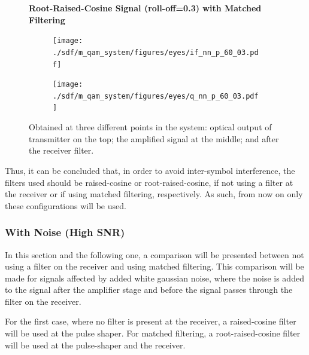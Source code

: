 \begin{refsection}
\begin{table}[H]
\begin{tabular}{|l|l|}
	\end{tabular}
\end{table}
\begin{figure}[H]
		\centering
	\textbf{Root-Raised-Cosine Signal (roll-off=0.3) with Matched Filtering}
	\begin{minipage}{\linewidth}
		\centering
	\begin{subfigure}{.45\textwidth}
		\centering
		\texttt{[image: ./sdf/m\_qam\_system/figures/eyes/if\_nn\_p\_60\_03.pdf]}
	\end{subfigure}
	\begin{subfigure}{.45\textwidth}
		\centering
		\texttt{[image: ./sdf/m\_qam\_system/figures/eyes/q\_nn\_p\_60\_03.pdf]}
	\end{subfigure}
	
	\caption{
		Obtained at
		three different points in the system: optical output of transmitter on the top;
		the amplified signal at the middle; and
		after the receiver filter.
		\label{fig:eyes_nn_rrc_03}}
	\end{minipage}
	
\end{figure}

Thus, it can be concluded that, in order to avoid inter-symbol interference,
the filters used should be raised-cosine or root-raised-cosine, if not using a
filter at the receiver or if using matched filtering, respectively. As such,
from now on only these configurations will be used.

\subsubsection*{With Noise (High SNR)}

In this section and the following one, a comparison will be presented between
not using a filter on the receiver and using matched filtering. This comparison
will be made for signals affected by added white gaussian noise, where the
noise is added to the signal after the amplifier stage and before the signal
passes through the filter on the receiver.

For the first case, where no filter is present at the receiver, a
raised-cosine filter will be used at the pulse shaper. For matched filtering, a
root-raised-cosine filter will be used at the pulse-shaper and the receiver.


\end{refsection}
